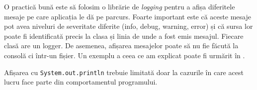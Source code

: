 O practică bună este să folosim o librărie de \textit{logging} pentru a afișa diferitele mesaje pe care aplicația le dă pe parcurs. Foarte important este că aceste mesaje pot avea niveluri de severitate diferite (info, debug, warning, error) și că sursa lor poate fi identificată precis la clasa și linia de unde a fost emis mesajul. Fiecare clasă are un logger. De asemenea, afișarea mesajelor poate să nu fie făcută la consolă ci într-un fișier. Un exemplu a ceea ce am explicat poate fi urmărit în .


\lstset{language=make}
\lstset{caption=Exemplu de logging realizat de Apache Log4j,  label=lst:logging}


Afișarea cu \texttt{System.out.println} trebuie limitată doar la cazurile în care acest lucru face parte din comportamentul programului.






















